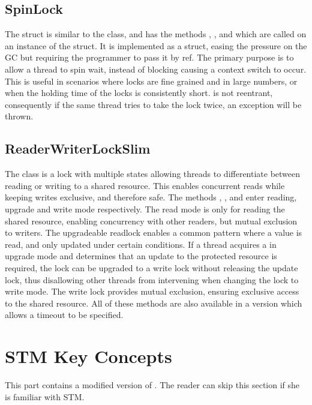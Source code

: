 \subsection{SpinLock}
The  struct\cite{msdnSpinLock} is similar to the  class, and has the methods , , and  which are called on an instance of the struct. It is implemented as a struct, easing the pressure on the \ac{GC} but requiring the programmer to pass it by ref. The primary purpose is to allow a thread to spin wait, instead of blocking causing a context switch to occur. This is useful in scenarios where locks are fine grained and in large numbers, or when the holding time of the locks is consistently short.  is not reentrant, consequently if the same thread tries to take the lock twice, an exception will be thrown.

\subsection{ReaderWriterLockSlim}
The class \cite{msdnReaderWriterLockSlim} is a lock with multiple states allowing threads to differentiate between reading or writing to a shared resource. This enables concurrent reads while keeping writes exclusive, and therefore safe. The methods , , and  enter reading, upgrade and write mode respectively. The read mode is only for reading the shared resource, enabling concurrency with other readers, but mutual exclusion to writers. The upgradeable readlock enables a common pattern where a value is read, and only updated under certain conditions. If a thread acquires a  in upgrade mode and determines that an update to the protected resource is required, the lock can be upgraded to a write lock without releasing the update lock, thus disallowing other threads from intervening when changing the lock to write mode. The write lock provides mutual exclusion, ensuring exclusive access to the shared resource. All of these methods are also available in a version which allows a timeout to be specified.

\section{STM Key Concepts}
This part contains a modified version of \cite[p. 43-48]{dpt907e14trending}. The reader can skip this section if she is familiar with \ac{STM}. 
\label{chap:stm_key_concepts}

